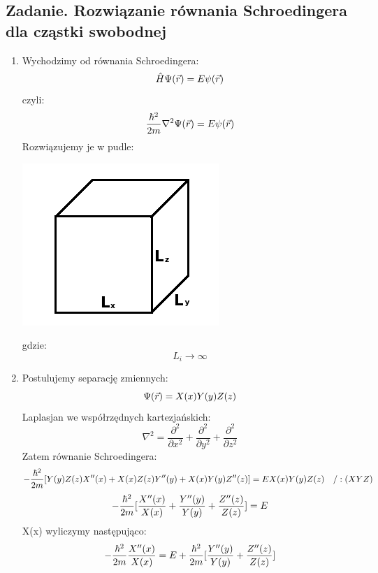 \subsection{Zadanie. Rozwiązanie równania Schroedingera dla cząstki swobodnej}
\begin{enumerate}
\item Wychodzimy od równania Schroedingera:
\begin{equation} \hat{H}\Psi(\vec{r})=E\psi(\vec{r})\end{equation}
czyli:
\begin{equation} \frac{\hbar^2}{2m}\nabla^2\Psi(\vec{r})=E\psi(\vec{r})\end{equation}
Rozwiązujemy je w pudle:\\
\begin{center}\includegraphics[scale=0.7]{obrazki/cwicz01_rys1.png}\end{center}
gdzie:
\begin{equation} L_i\rightarrow \infty\end{equation}
\item Postulujemy separację zmiennych:
\begin{equation}\Psi(\vec{r})=X(x)Y(y)Z(z)\end{equation}
Laplasjan we współrzędnych kartezjańskich:
\begin{equation}\nabla^2=\frac{\partial^2}{\partial x^2}+\frac{\partial^2}{\partial y^2}+\frac{\partial^2}{\partial z^2}\end{equation}
Zatem równanie Schroedingera:
\begin{equation} -\frac{\hbar^2}{2m}[Y(y)Z(z)X''(x)+X(x)Z(z)Y''(y)+X(x)Y(y)Z''(z)]=EX(x)Y(y)Z(z)~~~/:(XYZ)
\end{equation}
\begin{equation}-\frac{\hbar^2}{2m}[\frac{X''(x)}{X(x)}+\frac{Y''(y)}{Y(y)}+\frac{Z''(z)}{Z(z)}]=E\end{equation}
X(x) wyliczymy następująco:
\begin{equation}-\frac{\hbar^2}{2m}\frac{X''(x)}{X(x)}=E+\frac{\hbar^2}{2m}[\frac{Y''(y)}{Y(y)}+\frac{Z''(z)}{Z(z)}]\end{equation}

\end{enumerate}
